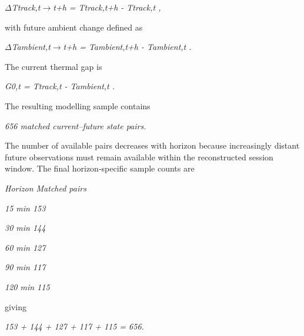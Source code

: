 \begin{center}\textit{\ensuremath{\Delta}Ttrack,t\ensuremath{\rightarrow}t+h = Ttrack,t+h - Ttrack,t ,}\end{center}

with future ambient change defined as

\begin{center}\textit{\ensuremath{\Delta}Tambient,t\ensuremath{\rightarrow}t+h = Tambient,t+h - Tambient,t .}\end{center}

The current thermal gap is

\begin{center}\textit{G0,t = Ttrack,t - Tambient,t .}\end{center}

The resulting modelling sample contains

\begin{center}\textit{656 matched current--future state pairs.}\end{center}

The number of available pairs decreases with horizon because increasingly distant future observations must remain available within the reconstructed session window. The final horizon-specific sample counts are

\begin{center}\textit{Horizon    Matched pairs}\end{center}

\begin{center}\textit{15 min         153}\end{center}

\begin{center}\textit{30 min         144}\end{center}

\begin{center}\textit{60 min         127}\end{center}

\begin{center}\textit{90 min         117}\end{center}

\begin{center}\textit{120 min        115}\end{center}

giving

\begin{center}\textit{153 + 144 + 127 + 117 + 115 = 656.}\end{center}

